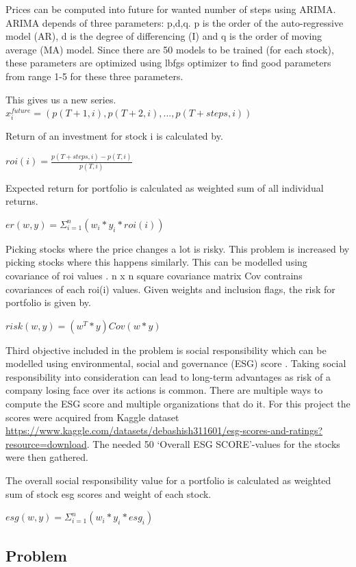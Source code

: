 \documentclass[11pt]{article} %
\begin{document}
Prices can be computed into future for wanted number of steps using ARIMA. ARIMA depends of three parameters: p,d,q. p is the order of the auto-regressive model (AR), d is the degree of differencing (I) and q is the order of moving average (MA) model. Since there are 50 models to be trained (for each stock), these parameters are optimized using lbfgs optimizer to find good parameters from range 1-5 for these three parameters.

This gives us a new series.
$x_i^{future} = (p(T+1, i), p(T+2, i), ..., p(T+steps, i))$

Return of an investment for stock i is calculated by.

$roi(i) = \frac{p(T+steps,i) - p(T,i)}{p(T,i)}$

Expected return for portfolio is calculated as weighted sum of all individual returns.

$er(w,y) = \Sigma_{i=1}^{n} (w_i * y_i * roi(i))$

Picking stocks where the price changes a lot is risky. This problem is increased by picking stocks where this happens similarly. This can be modelled using covariance of roi values \cite{kolm201460}. n x n square covariance matrix Cov contrains covariances of each roi(i) values. Given weights and inclusion flags, the risk for portfolio is given by.

$risk(w,y) = (w^T * y) Cov (w * y)$

Third objective included in the problem is social responsibility which can be modelled using environmental, social and governance (ESG) score \cite{chen2021social}. Taking social responsibility into consideration can lead to long-term advantages as risk of a company losing face over its actions is common. There are multiple ways to compute the ESG score and multiple organizations that do it. For this project the scores were acquired from Kaggle dataset \url{https://www.kaggle.com/datasets/debashish311601/esg-scores-and-ratings?resource=download}. The needed 50 `Overall ESG SCORE'-values for the stocks were then gathered. 

The overall social responsibility value for a portfolio is calculated as weighted sum of stock esg scores and weight of each stock.

$esg(w,y) = \Sigma_{i=1}^n (w_i * y_i * esg_i)$



\subsection{Problem}
\end{document}
